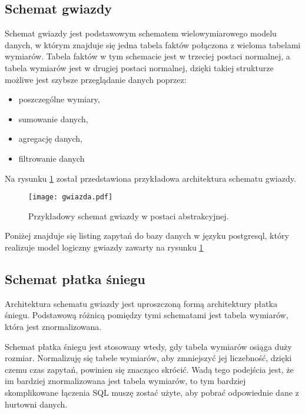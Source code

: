 \subsection{Schemat gwiazdy}
Schemat gwiazdy jest podstawowym schematem wielowymiarowego modelu danych,
 w którym znajduje się jedna tabela faktów połączona z wieloma tabelami wymiarów.
Tabela faktów w tym schemacie jest w trzeciej postaci normalnej, a tabela wymiarów jest w drugiej postaci normalnej,
dzięki takiej strukturze możliwe jest szybsze przeglądanie danych poprzez:
\begin{itemize}
 \item poszczególne wymiary,
 \item sumowanie danych,
 \item agregację danych,
 \item filtrowanie danych
\end{itemize}

Na rysunku  \ref{fig:gwiazda} został przedstawiona przykładowa architektura schematu gwiazdy.
\begin{center}
\begin{figure}[H]
  \begin{center}
    \texttt{[image: gwiazda.pdf]}
  \end{center}
  \caption{Przykładowy schemat gwiazdy w postaci abstrakcyjnej. }
    \label{fig:gwiazda}
\end{figure}
\end{center}
Poniżej znajduje się listing zapytań do bazy danych w języku postgresql,
 który realizuje model logiczny gwiazdy zawarty na rysunku \ref{fig:gwiazda}


\subsection{Schemat płatka śniegu}
Architektura schematu gwiazdy jest uproszczoną formą architektury płatka śniegu.
Podstawową różnicą pomiędzy tymi schematami jest tabela wymiarów, która jest znormalizowana.

Schemat płatka śniegu jest stosowany wtedy, gdy tabela wymiarów osiąga duży rozmiar.
Normalizuję się tabele wymiarów, aby zmniejszyć jej liczebność, dzięki czemu czas zapytań, 
powinien się znacząco skrócić. 
Wadą tego podejścia jest, że im bardziej znormalizowana jest tabela wymiarów,  
to tym bardziej skomplikowane łączenia SQL muszę zostać użyte, aby pobrać odpowiednie
dane z hurtowni danych. \cite{cube}

